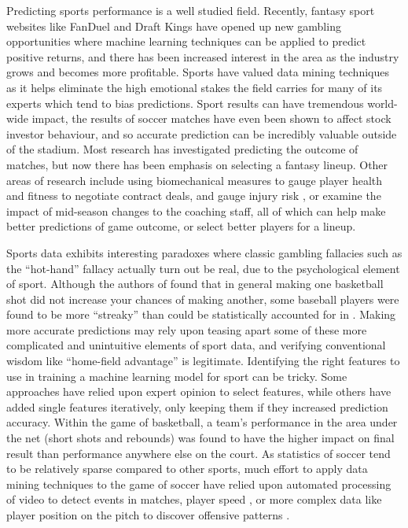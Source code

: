 \documentclass[conference]{IEEEtran}
\begin{document}
Predicting sports performance is a well studied field. Recently, fantasy sport websites like FanDuel and Draft Kings have opened up new gambling opportunities where machine learning techniques can be applied to predict positive returns\cite{Sugar:aa}, and there has been increased interest in the area\cite{Bishop:2004aa} as the industry grows and becomes more profitable. Sports have valued data mining techniques as it helps eliminate the high emotional stakes the field carries for many of its experts which tend to bias predictions\cite{Haghighat:2013aa}. Sport results can have tremendous world-wide impact, the results of soccer matches have even been shown to affect stock investor behaviour\cite{Edmans:2007aa}, and so accurate prediction can be incredibly valuable outside of the stadium. Most research has investigated predicting the outcome of matches, but now there has been emphasis on selecting a fantasy lineup. Other areas of research include using biomechanical measures to gauge player health and fitness to negotiate contract deals\cite{Davenport:2010aa}, and gauge injury risk \cite{Carling:2012aa,Owen:2015aa}, or examine the impact of mid-season changes to the coaching staff\cite{coach}, all of which can help make better predictions of game outcome, or select better players for a lineup.

Sports data exhibits interesting paradoxes where classic gambling fallacies such as the ``hot-hand'' fallacy actually turn out be real, due to the psychological element of sport. Although the authors of \cite{Gilovich:1985aa} found that in general making one basketball shot did not increase your chances of making another, some baseball players were found to be more ``streaky'' than could be statistically accounted for in \cite{Albert:2008aa}. Making more accurate predictions may rely upon teasing apart some of these more complicated and unintuitive elements of sport data, and verifying conventional wisdom like ``home-field advantage'' is legitimate\cite{textbook}. Identifying the right features to use in training a machine learning model for sport can be tricky. Some approaches have relied upon expert opinion to select features\cite{Zdravevski:2010aa}, while others have added single features iteratively, only keeping them if they increased prediction accuracy\cite{Buursma:2011aa}. Within the game of basketball, a team's performance in the area under the net (short shots and rebounds) was found to have the higher impact on final result than performance anywhere else on the court\cite{Ivankovic:2010aa}. As statistics of soccer tend to be relatively sparse compared to other sports, much effort to apply data mining techniques to the game of soccer have relied upon automated processing of video to detect events in matches\cite{Sykora2015,goal_detection}, player speed \cite{Redwood-Brown:2012aa}, or more complex data like player position on the pitch to discover offensive patterns \cite{offence_patterns}. 
\end{document}
